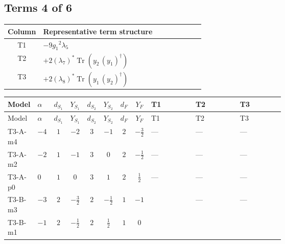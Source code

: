 \documentclass[8pt]{article}
\begin{document}
\begin{landscape}
\subsection*{Terms 4 of 6}
\begin{center}
\begin{tabular}{@{}c >{\raggedright\arraybackslash}p{0.82\linewidth}@{}}
\toprule
Column & Representative term structure \\
\midrule
T1 & \(\displaystyle -9 {g_1}^2 {\lambda_5}\) \\
\midrule
T2 & \(\displaystyle +2 \left({\lambda_{7}}\right)^{*} \operatorname{Tr}\!\left({y_2}\,\left({y_1}\right)^{\dagger}\right)\) \\
\midrule
T3 & \(\displaystyle +2 \left({\lambda_{8}}\right)^{*} \operatorname{Tr}\!\left({y_1}\,\left({y_2}\right)^{\dagger}\right)\) \\
\midrule
\bottomrule
\end{tabular}
\end{center}
\smallskip
\tiny
\begin{longtable}{@{}llcccccc >{\raggedright\arraybackslash}p{0.21\linewidth} >{\raggedright\arraybackslash}p{0.21\linewidth} >{\raggedright\arraybackslash}p{0.21\linewidth}@{}}
\toprule
Model & $\alpha$ & $d_{S_1}$ & $Y_{S_1}$ & $d_{S_2}$ & $Y_{S_2}$ & $d_F$ & $Y_F$ & T1 & T2 & T3 \\
\midrule
\endfirsthead
\toprule
Model & $\alpha$ & $d_{S_1}$ & $Y_{S_1}$ & $d_{S_2}$ & $Y_{S_2}$ & $d_F$ & $Y_F$ & T1 & T2 & T3 \\
\midrule
\endhead
T3-A-m4 & $-4$ & $1$ & $-2$ & $3$ & $-1$ & $2$ & $-\frac{3}{2}$ & --- & --- & --- \\
\midrule
T3-A-m2 & $-2$ & $1$ & $-1$ & $3$ & $0$ & $2$ & $-\frac{1}{2}$ & --- & --- & --- \\
\midrule
T3-A-p0 & $0$ & $1$ & $0$ & $3$ & $1$ & $2$ & $\frac{1}{2}$ & --- & --- & --- \\
\midrule
T3-B-m3 & $-3$ & $2$ & $-\frac{3}{2}$ & $2$ & $-\frac{1}{2}$ & $1$ & $-1$ & \scriptsize\adjustbox{max width=\linewidth}{$\begin{gathered} -9 {g_1}^2 {\lambda_5}\end{gathered}$} & --- & --- \\
\midrule
T3-B-m1 & $-1$ & $2$ & $-\frac{1}{2}$ & $2$ & $\frac{1}{2}$ & $1$ & $0$ & \scriptsize\adjustbox{max width=\linewidth}{$\begin{gathered} -3 {g_1}^2 {\lambda_5}\end{gathered}$} & \scriptsize\adjustbox{max width=\linewidth}{$\begin{gathered} +2 \left({\lambda_{7}}\right)^{*} \operatorname{Tr}\!\left({y_2}\,\left({y_1}\right)^{\dagger}\right)\end{gathered}$} & \scriptsize\adjustbox{max width=\linewidth}{$\begin{gathered} +2 \left({\lambda_{8}}\right)^{*} \operatorname{Tr}\!\left({y_1}\,\left({y_2}\right)^{\dagger}\right)\end{gathered}$} \\

\end{longtable}
\end{landscape}
\end{document}

